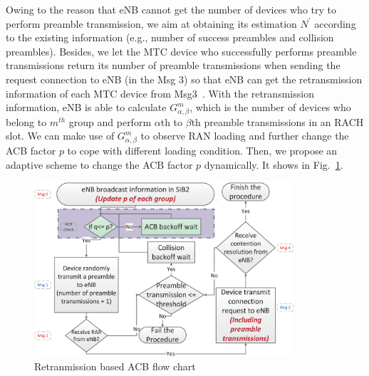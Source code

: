     Owing to the reason that eNB cannot get the number of devices who try to perform preamble transmission, we aim at obtaining its estimation $N^\prime$ according to the existing information (e.g., number of success preambles and collision preambles). Besides, we let the MTC device who successfully performs preamble transmissions return its number of preamble transmissions when sending the request connection to eNB (in the Msg 3) so that eNB can get the retransmission information of each MTC device from Msg3~\cite{de2015random}. With the retransmission information, eNB is able to calculate $G_{\alpha,\beta}^{m}$, which is the number of devices who belong to $m^{th}$ group and perform $\alpha$th to $\beta$th preamble transmissions in an RACH slot. We can make use of $G_{\alpha,\beta}^{m}$ to observe RAN loading and further change the ACB factor $p$ to cope with different loading condition. Then, we propose an adaptive scheme to change the ACB factor $p$ dynamically. It shows in Fig.~\ref{fig_propose_flow_chart}.

    \begin{figure}[t]
    \centering
    \includegraphics[width=3.8in]{fig_proposed_flow_chart.eps}
    \caption{Retranmission based ACB flow chart}
    \label{fig_propose_flow_chart}
    \end{figure}